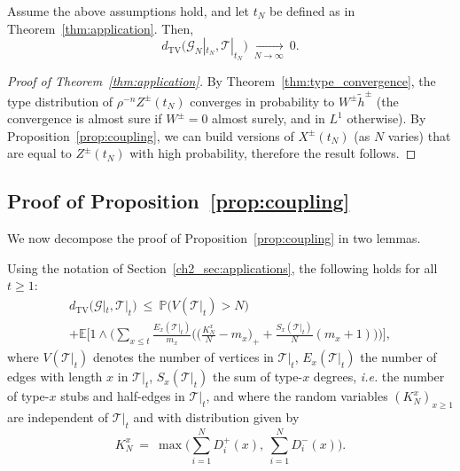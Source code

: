 \begin{refsegment}
\begin{prop}\label{prop:coupling}
Assume the above assumptions hold, and let $t_N$ be defined as in
Theorem~\ref{thm:application}. Then,
\begin{equation*}
d_{\mathrm{TV}}\big(\mathcal{G}_N|_{t_N},\mathcal{T}|_{t_N}\big)\ \underset{N\to\infty}{\longrightarrow}\ 0.
\end{equation*}
\end{prop}

\begin{proof}[Proof of Theorem~\ref{thm:application}]
  By Theorem~\ref{thm:type_convergence}, the type distribution of
  $\rho^{-n} Z^{\pm}(t_N)$ converges in probability to
  $W^{\pm}\tilde h^{\pm}$ (the convergence is almost sure if $W^\pm=0$
  almost surely, and in $L^1$ otherwise). By
  Proposition~\ref{prop:coupling}, we can build versions of
  $X^\pm(t_N)$ (as $N$ varies) that are equal to $Z^{\pm}(t_N)$ with
  high probability, therefore the result follows.
\end{proof}


\subsection{Proof of Proposition~\ref{prop:coupling}}


We now decompose the proof of Proposition~\ref{prop:coupling} in two
lemmas.

\begin{lem} \label{lem:proof_coupling_1} Using the notation of
  Section~\ref{ch2_sec:applications}, the following holds for all $t\geq 1$:
  \begin{multline}
    \label{eq:bound_TV_lemma}
      d_{\mathrm{TV}}\big(\mathcal{G}|_{t},\mathcal{T}|_{t}\big) \
      \leq\ \mathbb{P}\big(V(\mathcal{T}|_t) > N\big) \\
      +  \mathbb{E}\Big[1\wedge \bigg(\sum_{x\leq
        t}\frac{E_x(\mathcal{T}|_{t})}{m_x} \bigg(
        \Big(\frac{{K}_N^{x}}{N} - m_{x}\Big)_+
        +\frac{S_x(\mathcal{T}|_{t})}{N} (m_x + 1) \bigg)
        \bigg)\Big],
    \end{multline}
  where $V(\mathcal{T}|_t)$ denotes the number of vertices in
  $\mathcal{T}|_t$, $E_x(\mathcal{T}|_{t})$ the number of
  edges with length $x$ in $\mathcal{T}|_t$, $S_x(\mathcal{T}|_{t})$ the sum of
  type-$x$ degrees, \textit{i.e.} the number of type-$x$ stubs and
  half-edges in $\mathcal{T}|_{t}$, and where the random variables
  $({K}_N^x)_{x\geq 1}$ are independent of $\mathcal{T}|_{t}$ and with
  distribution given by
  \begin{equation}\label{eq:K_N_x}
    K^x_N\ =\ \max\Big(\sum_{i=1}^N D^{+}_{i}(x),\ \sum_{i=1}^N D^{-}_{i}(x) \Big).
  \end{equation}
\end{lem}


\end{refsegment}
